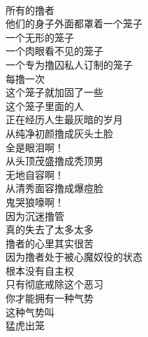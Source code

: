 \begin{poem}[无形的笼子]
    \begin{multicols}{2}
        \begin{center}~\\
            所有的撸者 \\ 他们的身子外面都罩着一个笼子 \\ 一个无形的笼子 \\ 一个肉眼看不见的笼子 \\ 一个专为撸囚私人订制的笼子 \\ 每撸一次 \\ 这个笼子就加固了一些 \\ 这个笼子里面的人 \\ 正在经历人生最灰暗的岁月 \\ 从纯净初颜撸成灰头土脸 \\ 全是眼泪啊！ \\ 从头顶茂盛撸成秃顶男 \\ 无地自容啊！ \\ 从清秀面容撸成爆痘脸 \\ 鬼哭狼嚎啊！ \\ 因为沉迷撸管 \\ 真的失去了太多太多 \\ 撸者的心里其实很苦 \\ 因为撸者处于被心魔奴役的状态 \\ 根本没有自主权 \\ 只有彻底戒除这个恶习 \\ 你才能拥有一种气势 \\ 这种气势叫 \\ 猛虎出笼
        \end{center}
    \end{multicols}
\end{poem}

